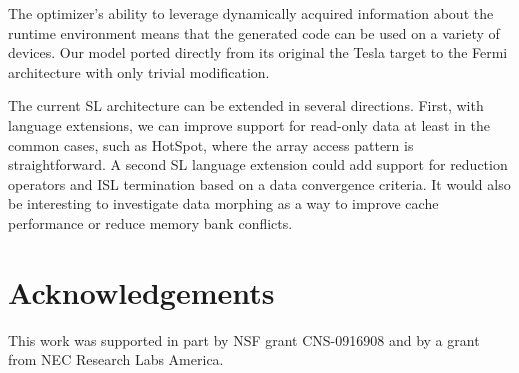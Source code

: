 \documentclass{sig-alternate}
\begin{document}
The optimizer's ability to leverage dynamically acquired information about
the runtime environment means that the generated code can be used on a
variety of devices.  Our model ported directly from its original the Tesla
target to the Fermi architecture with only trivial modification.

The current SL architecture can be extended in several directions.  First,
with language extensions, we can improve support for read-only data at least
in the common cases, such as HotSpot, where the array access pattern is
straightforward.  A second SL language extension could add support for
reduction operators and ISL termination based on a data convergence criteria.
It would also be interesting to investigate data morphing as a way to improve
cache performance or reduce memory bank conflicts.

\section*{Acknowledgements}
This work was supported in part by NSF grant CNS-0916908 and by a grant from
NEC Research Labs America.




\balance


\end{document}
